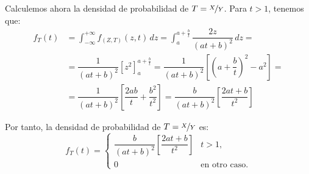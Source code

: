 \begin{ejercicio}
    Calculemos ahora la densidad de probabilidad de $T=\nicefrac{X}{Y}$. Para $t>1$, tenemos que:
    \begin{align*}
        f_T(t)&=\int_{-\infty}^{+\infty} f_{(Z,T)}(z, t) \, dz
        = \int_{a}^{a+\frac{b}{t}} \dfrac{2z}{(at+b)^2} \, dz
        =\\&= \dfrac{1}{(at+b)^2}\left[z^2\right]_{a}^{a+\frac{b}{t}}
        = \dfrac{1}{(at+b)^2}\left[\left(a+\dfrac{b}{t}\right)^2-a^2\right]
        =\\&= \dfrac{1}{(at+b)^2}\left[\dfrac{2ab}{t}+\dfrac{b^2}{t^2}\right]
        = \dfrac{b}{(at+b)^2}\left[\dfrac{2at+b}{t^2}\right]
    \end{align*}

    Por tanto, la densidad de probabilidad de $T=\nicefrac{X}{Y}$ es:
    \begin{equation*}
        f_T(t) = \begin{cases}
            \dfrac{b}{(at+b)^2}\left[\dfrac{2at+b}{t^2}\right] & t>1, \\
            0 & \text{en otro caso}.
        \end{cases}
    \end{equation*}


\end{ejercicio}

